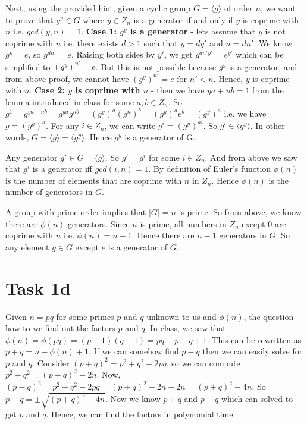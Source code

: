 \documentclass{article}
\begin{document}
    Next, using the provided hint, given a cyclic group $G = \langle g \rangle$ of order $n$, we want to prove that $g^y \in G$ where $y \in Z_n$ is a generator if and only if $y$ is coprime with $n$ i.e. $gcd(y, n) = 1$. \textbf{Case 1: $g^y$ is a generator} - lets assume that $y$ is not coprime with $n$ i.e. there exists $d > 1$ such that $y = dy'$ and $n = dn'$. We know $g^n = e$, so $g^{dn'} = e$. Raising both sides by $y'$, we get $g^{dn'y'} = e^{y'}$ which can be simplified to $(g^y)^{n'} = e$. But this is not possible because $g^y$ is a generator, and from above proof, we cannot have $(g^y)^{n'} = e$ for $n' < n$. Hence, $y$ is coprime with $n$. \textbf{Case 2: $y$ is coprime with $n$} - then we have $ya + nb = 1$ from the lemma introduced in class for some $a, b \in Z_n$. So $g^1 = g^{ya + nb} = g^{ya}g^{nb} = (g^y)^a(g^n)^b = (g^y)^ae^b = (g^y)^a$ i.e. we have $g = (g^y)^a$. For any $i \in Z_n$, we can write $g^i = (g^y)^{ai}$. So $g^i \in \langle g^y \rangle$. In other words, $G = \langle g \rangle = \langle g^y \rangle$. Hence $g^y$ is a generator of G.

    Any generator $g' \in G = \langle g \rangle$. So $g' = g^i$ for some $i \in Z_n$. And from above we saw that $g^i$ is a generator iff $gcd(i, n) = 1$. By definition of Euler's function $\phi(n)$ is the number of elements that are coprime with $n$ in $Z_n$. Hence $\phi(n)$ is the number of generators in $G$.

    A group with prime order implies that $|G| = n$ is prime. So from above, we know there are $\phi(n)$ generators. Since $n$ is prime, all numbers in $Z_n$ except 0 are coprime with $n$ i.e. $\phi(n) = n-1$. Hence there are $n-1$ generators in $G$. So any element $g \in G$ except $e$ is a generator of $G$.

    \section*{Task 1d}
    Given $n = pq$ for some primes $p$ and $q$ unknown to us and $\phi(n)$, the question how to we find out the factors $p$ and $q$. In class, we saw that $\phi(n) = \phi(pq) = (p-1)(q-1) = pq - p - q + 1$. This can be rewritten as $p + q = n - \phi(n) + 1$. If we can somehow find $p - q$ then we can easily solve for $p$ and $q$. Consider $(p + q)^2 = p^2 + q^2 + 2pq$, so we can compute $p^2 + q^2 = (p+q)^2 - 2n$. Now, $(p - q)^2 = p^2 + q^2 - 2pq = (p + q)^2 - 2n - 2n = (p + q)^2 - 4n$. So $p - q = \pm \sqrt{(p + q)^2 - 4n}$. Now we know $p + q$ and $p - q$ which can solved to get $p$ and $q$. Hence, we can find the factors in polynomial time.
\end{document}
